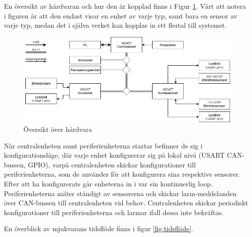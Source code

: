 \documentclass{article}
\begin{document}
En översikt av hårdvaran och hur den är kopplad finns i Figur \ref{fig:hårdvara}. Värt att notera i figuren är att den endast visar en enhet av varje typ, samt bara en sensor av varje typ, medan det i själva verket kan kopplas in ett flertal till systemet.
\begin{figure}[H] %
    \centering
    \includegraphics[width=1\textwidth]{figurer/HardvaraOversikt.png}
    \caption{Översikt över hårdvara}
    \label{fig:hårdvara}
\end{figure}

När centralenheten samt periferienheterna startar befinner de sig i konfigurationsläge, där varje enhet konfigurerar sig på lokal nivå (USART CAN-bussen, GPIO), varpå centralenheten skickar konfigurationer till periferienheterna, som de använder för att konfigurera sina respektive sensorer.
Efter att ha konfigurerats går enheterna in i var sin kontinuerlig loop. Periferienheterna mäter ständigt av sensorerna och skickar larm-meddelanden över CAN-bussen till centralenheten vid behov. Centralenheten skickar periodiskt konfigurationer till periferienheterna och larmar ifall dessa inte bekräftas.

En överblick av mjukvarans tidsflöde finns i figur \ref{fig:tidsflöde}.
\end{document}
